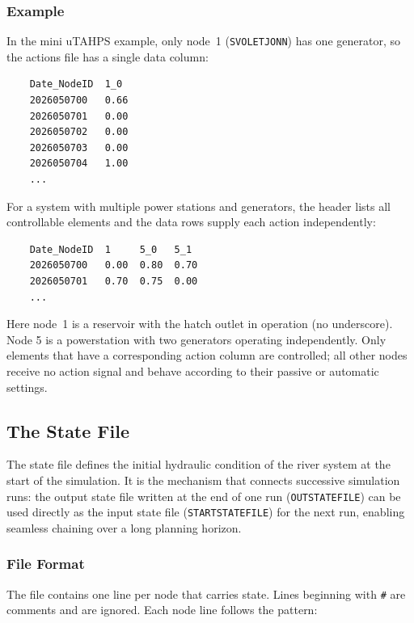 \documentclass[a4paper, 12pt]{report}
\begin{document}
	\subsubsection{Example}

	In the mini uTAHPS example, only node~1 (\texttt{SVOLETJONN}) has one generator, so the
	actions file has a single data column:

	\begin{verbatim}
	Date_NodeID  1_0
	2026050700   0.66
	2026050701   0.00
	2026050702   0.00
	2026050703   0.00
	2026050704   1.00
	...
	\end{verbatim}

	For a system with multiple power stations and generators, the header lists all controllable
	elements and the data rows supply each action independently:

	\begin{verbatim}
	Date_NodeID  1     5_0   5_1
	2026050700   0.00  0.80  0.70
	2026050701   0.70  0.75  0.00
	...
	\end{verbatim}

	Here node~1 is a reservoir with the hatch outlet in operation (no underscore). Node 5 is a powerstation with two generators operating independently. Only elements that have a corresponding action column are controlled; all other nodes receive no action signal and behave according to their passive or automatic settings.

	
	\subsection{The State File}
	\label{sec:statefile}
	
	The state file defines the initial hydraulic condition of the river system at the start of
	the simulation. It is the mechanism that connects successive simulation runs: the output
	state file written at the end of one run (\texttt{OUTSTATEFILE}) can be used directly as
	the input state file (\texttt{STARTSTATEFILE}) for the next run, enabling seamless
	chaining over a long planning horizon.
	
	\subsubsection{File Format}
	
	The file contains one line per node that carries state. Lines beginning with \texttt{\#}
	are comments and are ignored. Each node line follows the pattern:
	
\end{document}
